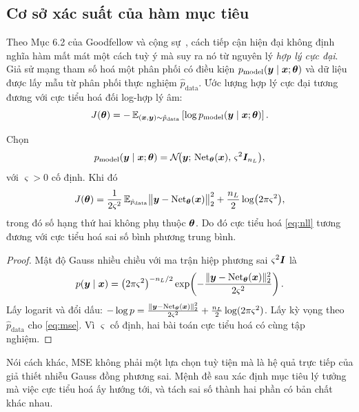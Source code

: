 \subsection{Cơ sở xác suất của hàm mục tiêu}
\label{subsec:ham-muc-tieu}
 
Theo Mục 6.2 của Goodfellow và cộng sự~\cite{goodfellow2016}, cách tiếp cận hiện
đại không định nghĩa hàm mất mát một cách tuỳ ý mà suy ra nó từ nguyên lý
\emph{hợp lý cực đại}. Giả sử mạng tham số hoá một phân phối có điều kiện
$p_{\text{model}}(\bm{y}\mid\bm{x};\bm{\theta})$ và dữ liệu được lấy mẫu từ phân phối
thực nghiệm $\hat{p}_{\text{data}}$. Ước lượng hợp lý cực đại tương đương với
cực tiểu hoá đối log-hợp lý âm:
\begin{equation}
J(\bm{\theta})
 = -\,\mathbb{E}_{(\bm{x},\bm{y}) \sim \hat{p}_{\text{data}}}
   \left[ \log p_{\text{model}}(\bm{y}\mid\bm{x};\bm{\theta}) \right].
\label{eq:nll}
\end{equation}
 
\begin{menhde}
\label{md:gauss-mse}
Chọn
\[
  p_{\text{model}}(\bm{y}\mid\bm{x};\bm{\theta})
  = \mathcal{N}\!\big(\bm{y};\, \operatorname{Net}_{\bm{\theta}}(\bm{x}),\,
    \varsigma^{2}\bm{I}_{n_L}\big),
\]
với $\varsigma > 0$ cố định. Khi đó
\begin{equation}
J(\bm{\theta})
 = \frac{1}{2\varsigma^{2}}\,
   \mathbb{E}_{\hat{p}_{\text{data}}}
   \big\| \bm{y} - \operatorname{Net}_{\bm{\theta}}(\bm{x}) \big\|_2^{2}
   + \frac{n_L}{2}\log\!\big(2\pi\varsigma^2\big),
\label{eq:mse}
\end{equation}
trong đó số hạng thứ hai không phụ thuộc $\bm{\theta}$. Do đó cực tiểu hoá
\eqref{eq:nll} tương đương với cực tiểu hoá sai số bình phương trung bình.
\end{menhde}
 
\begin{proof}
Mật độ Gauss nhiều chiều với ma trận hiệp phương sai $\varsigma^2\bm{I}$ là
\[
p(\bm{y}\mid\bm{x}) = \big(2\pi\varsigma^2\big)^{-n_L/2}
  \exp\!\left(-\frac{\|\bm{y} - \operatorname{Net}_{\bm{\theta}}(\bm{x})\|_2^2}{2\varsigma^2}\right).
\]
Lấy logarit và đổi dấu:
$-\log p = \frac{\|\bm{y} - \operatorname{Net}_{\bm{\theta}}(\bm{x})\|_2^2}{2\varsigma^2}
+ \frac{n_L}{2}\log(2\pi\varsigma^2)$. Lấy kỳ vọng theo
$\hat p_{\text{data}}$ cho \eqref{eq:mse}. Vì $\varsigma$ cố định, hai bài toán
cực tiểu hoá có cùng tập nghiệm.
\end{proof}
 
Nói cách khác, MSE không phải một lựa chọn tuỳ tiện mà là hệ quả trực tiếp của
giả thiết nhiễu Gauss đồng phương sai. Mệnh đề sau xác định mục tiêu lý tưởng mà
việc cực tiểu hoá ấy hướng tới, và tách sai số thành hai phần có bản chất khác
nhau.
 
